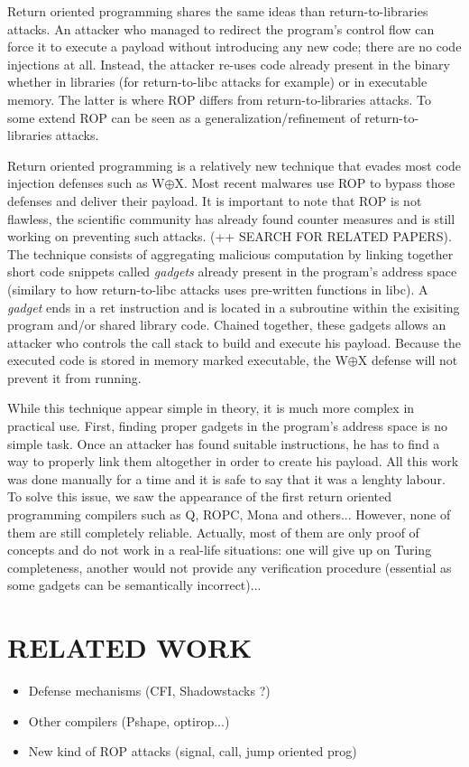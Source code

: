 \documentclass[10pt,twocolumn]{article}
\begin{document}
Return oriented programming shares the same ideas than return-to-libraries
attacks. An attacker who managed to redirect the program's control flow can
force it to execute a payload without introducing any new code; there are no
code injections at all. Instead, the attacker re-uses code already present in
the binary whether in libraries (for return-to-libc attacks for example) or in
executable memory. The latter is where ROP differs from return-to-libraries
attacks. To some extend ROP can be seen as a generalization/refinement of
return-to-libraries attacks.

Return oriented programming is a relatively new technique that evades most code
injection defenses such as W$\oplus$X. Most recent malwares use ROP to bypass
those defenses and deliver their payload. It is important to note that ROP is
not flawless, the scientific community has already found counter measures and
is still working on preventing such attacks. (++ SEARCH FOR RELATED PAPERS).
The technique consists of aggregating malicious computation by linking together
short code snippets called \textit{gadgets} already present in the program's
address space (similary to how return-to-libc attacks uses pre-written
functions in libc).  A \textit{gadget} ends in a ret instruction and is located
in a subroutine within the exisiting program and/or shared library code.
Chained together, these gadgets allows an attacker who controls the call stack
to build and execute his payload. Because the executed code is stored in memory
marked executable, the W$\oplus$X defense will not prevent it from running.

While this technique appear simple in theory, it is much more complex in
practical use. First, finding proper gadgets in the program's address space is
no simple task. Once an attacker has found suitable instructions, he has to
find a way to properly link them altogether in order to create his payload. All
this work was done manually for a time and it is safe to say that it was a
lenghty labour. To solve this issue, we saw the appearance of the first return
oriented programming compilers such as Q, ROPC, Mona and others... However,
none of them are still completely reliable. Actually, most of them are only
proof of concepts and do not work in a real-life situations: one will give up
on Turing completeness, another would not provide any verification procedure
(essential as some gadgets can be semantically incorrect)...


\section{RELATED WORK}
\begin{itemize}
    \item Defense mechanisms (CFI, Shadowstacks ?)
    \item Other compilers (Pshape, optirop...)
    \item New kind of ROP attacks (signal, call, jump oriented prog)
\end{itemize}
\end{document}
